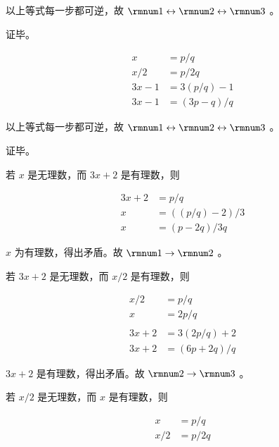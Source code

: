 {{\begin{practices}
            以上等式每一步都可逆，故 $\rmnum 1 \leftrightarrow \rmnum 2 \leftrightarrow \rmnum 3$ 。

            证毕。
        \end{practices}

        \begin{practices}
            \begin{align*}
                x &= p / q \\
                x / 2 &= p / 2q \\
                3x - 1 &= 3(p / q) - 1 \\
                3x - 1 &= (3p - q) / q
            \end{align*}

            以上等式每一步都可逆，故 $\rmnum 1 \leftrightarrow \rmnum 2 \leftrightarrow \rmnum 3$ 。

            证毕。
        \end{practices}

        \begin{practices}
            若 $x$ 是无理数，而 $3x + 2$ 是有理数，则

            \begin{align*}
                3x + 2 &= p / q \\
                x &= ((p / q) - 2) / 3 \\
                x &= (p - 2q) / 3q
            \end{align*}

            $x$ 为有理数，得出矛盾。故 $\rmnum 1 \rightarrow \rmnum 2$ 。

            若 $3x + 2$ 是无理数，而 $x / 2$ 是有理数，则

            \begin{align*}
                x / 2 &= p / q \\
                x &= 2p / q \\
                \\
                3x + 2 &= 3(2p / q) + 2 \\
                3x + 2 &= (6p + 2q) / q
            \end{align*}

            $3x + 2$ 是有理数，得出矛盾。故 $\rmnum 2 \rightarrow \rmnum 3$ 。

            若 $x / 2$ 是无理数，而 $x$ 是有理数，则

            \begin{align*}
                x &= p / q \\
                x / 2 &= p / 2q
            \end{align*}


\end{practices}}}
